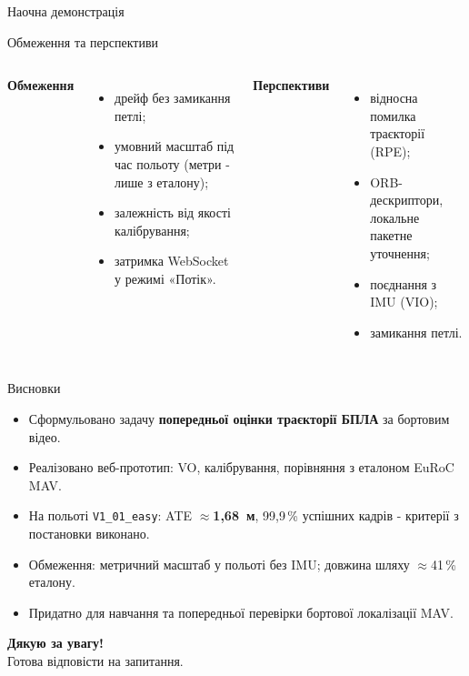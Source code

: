 \documentclass[aspectratio=169,12pt]{beamer}
\begin{document}
\begin{frame}{Наочна демонстрація}

\end{frame}

\begin{frame}{Обмеження та перспективи}
  \begin{columns}[T,onlytextwidth]
    \textbf{Обмеження}
    \begin{itemize}
      \item дрейф без замикання петлі;
      \item умовний масштаб під час польоту (метри - лише з еталону);
      \item залежність від якості калібрування;
      \item затримка WebSocket у режимі «Потік».
    \end{itemize}

    \textbf{Перспективи}
    \begin{itemize}
      \item відносна помилка траєкторії (RPE);
      \item ORB-дескриптори, локальне пакетне уточнення;
      \item поєднання з IMU (VIO);
      \item замикання петлі.
    \end{itemize}
  \end{columns}
\end{frame}

\begin{frame}{Висновки}
  \begin{itemize}
    \item Сформульовано задачу \textbf{попередньої оцінки траєкторії БПЛА} за бортовим відео.
    \item Реалізовано веб-прототип: VO, калібрування, порівняння з еталоном EuRoC MAV.
    \item На польоті \texttt{V1\_01\_easy}: ATE \textbf{$\approx$1,68~м}, 99,9\,\% успішних кадрів - критерії з постановки виконано.
    \item Обмеження: метричний масштаб у польоті без IMU; довжина шляху $\approx$41\,\% еталону.
    \item Придатно для навчання та попередньої перевірки бортової локалізації MAV.
  \end{itemize}
\end{frame}

\begin{frame}
  \centering
  \Large
  \textbf{Дякую за увагу!}\\[1.2em]
  Готова відповісти на запитання.
\end{frame}
\end{document}
